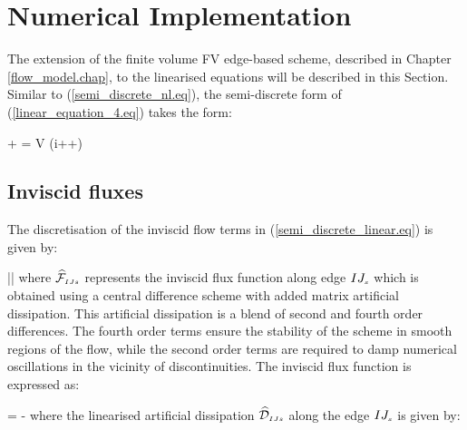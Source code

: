 \section{Numerical Implementation}
%
 The extension of the finite volume FV edge-based scheme, described
 in Chapter \ref{flow_model.chap}, to the linearised equations
 will be described in this Section.
 Similar to (\ref{semi_discrete_nl.eq}), the semi-discrete form
 of (\ref{linear_equation_4.eq}) takes the form:

%
\beq
 +\sum{} 
  = {\cal V}
 \left(i\omega{}++\right)
  \label{semi_discrete_linear.eq}
\eeq
%
%
%
\subsection{Inviscid fluxes}
%
 The discretisation of the inviscid flow terms in (\ref{semi_discrete_linear.eq})
 is given by:

%
\beq
  \sum{} \left|\vec{\eta}\right|
 \label{inviscid_contribution}
\eeq
%
 where $\widehat{\cal F}_{\mbox{\tiny $IJs$}}$ represents the inviscid flux function along edge
 $IJ_{\mbox{\tiny $s$}}$
 which is obtained using a central difference scheme with added
 matrix artificial dissipation. This artificial dissipation
 is a blend of second and fourth order differences. The fourth order
 terms ensure the stability of the scheme in smooth regions of the flow,
 while the second order terms are required to damp numerical oscillations
 in the vicinity of discontinuities.
 The inviscid flux function is expressed as:

%
\beq
   = 
  \cdot{}
  - 
\eeq
%
 where the linearised artificial dissipation
 $\widehat{\cal D}_{\mbox{\tiny $IJs$}}$ along the edge $IJ_{\mbox{\tiny $s$}}$ is
 given by:

